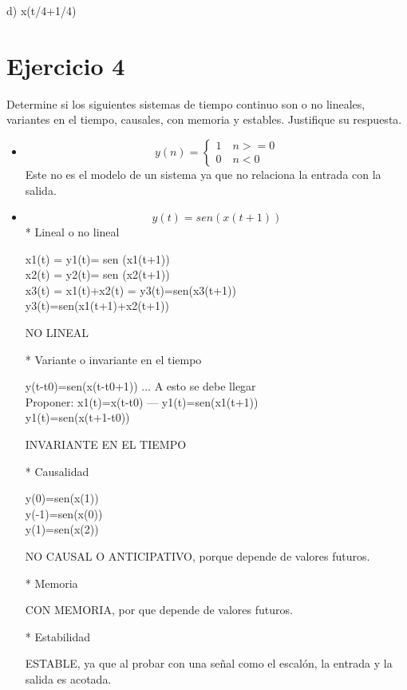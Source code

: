 \documentclass[10pt,a4paper]{report}
\begin{document}
d) x(t/4+1/4)

\section{Ejercicio 4}
Determine si los siguientes sistemas de tiempo continuo son o no lineales, variantes en el tiempo, causales, con memoria y estables. Justifique su respuesta.
\begin{itemize}
  \item
    \begin{equation}
 y(n)=
  \left\{
    \begin{aligned}
      1\quad n>=0\\
      0\quad n<0\
    \end{aligned}
  \right.
  \label{escunit}
\end{equation}
Este no es el modelo de un sistema ya que no relaciona la entrada con la salida.
  \item
    \begin{equation*}
y(t)=sen(x(t+1))
    \end{equation*}
* Lineal o no lineal

   x1(t) = y1(t)= sen (x1(t+1))\\
   x2(t) = y2(t)= sen (x2(t+1))\\
   x3(t) = x1(t)+x2(t) = y3(t)=sen(x3(t+1))\\
                         y3(t)=sen(x1(t+1)+x2(t+1))

 NO LINEAL

* Variante o invariante en el tiempo

  y(t-t0)=sen(x(t-t0+1)) ... A esto se debe llegar\\
  Proponer: x1(t)=x(t-t0) --- y1(t)=sen(x1(t+1))\\
  y1(t)=sen(x(t+1-t0))

  INVARIANTE EN EL TIEMPO

* Causalidad

y(0)=sen(x(1))\\
y(-1)=sen(x(0))\\
y(1)=sen(x(2))

NO CAUSAL O ANTICIPATIVO, porque depende de valores futuros.

* Memoria

CON MEMORIA, por que depende de valores futuros.

* Estabilidad

ESTABLE, ya que al probar con una señal como el escalón, la entrada y la salida es acotada.

\end{itemize}
\end{document}
